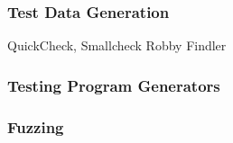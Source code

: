 \subsubsection*{Test Data Generation}

QuickCheck, Smallcheck
Robby Findler

\subsubsection*{Testing Program Generators}

\subsubsection*{Fuzzing}



